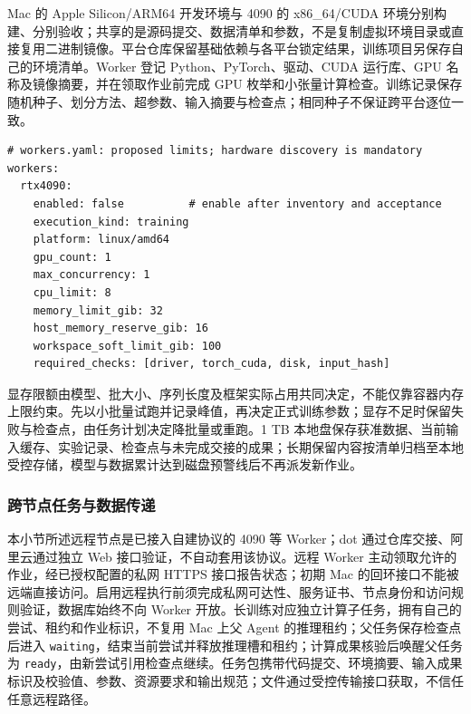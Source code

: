 \documentclass[11pt,a4paper]{article}
\begin{document}
Mac 的 Apple Silicon/ARM64 开发环境与 4090 的 x86\_64/CUDA 环境分别构建、分别验收；共享的是源码提交、数据清单和参数，不是复制虚拟环境目录或直接复用二进制镜像。平台仓库保留基础依赖与各平台锁定结果，训练项目另保存自己的环境清单。Worker 登记 Python、PyTorch、驱动、CUDA 运行库、GPU 名称及镜像摘要，并在领取作业前完成 GPU 枚举和小张量计算检查。训练记录保存随机种子、划分方法、超参数、输入摘要与检查点；相同种子不保证跨平台逐位一致。\cite{pytorch-repro}

\noindent\begin{minipage}{\linewidth}
\begin{lstlisting}
# workers.yaml: proposed limits; hardware discovery is mandatory
workers:
  rtx4090:
    enabled: false          # enable after inventory and acceptance
    execution_kind: training
    platform: linux/amd64
    gpu_count: 1
    max_concurrency: 1
    cpu_limit: 8
    memory_limit_gib: 32
    host_memory_reserve_gib: 16
    workspace_soft_limit_gib: 100
    required_checks: [driver, torch_cuda, disk, input_hash]
\end{lstlisting}
\end{minipage}


显存限额由模型、批大小、序列长度及框架实际占用共同决定，不能仅靠容器内存上限约束。先以小批量试跑并记录峰值，再决定正式训练参数；显存不足时保留失败与检查点，由任务计划决定降批量或重跑。1 TB 本地盘保存获准数据、当前输入缓存、实验记录、检查点与未完成交接的成果；长期保留内容按清单归档至本地受控存储，模型与数据累计达到磁盘预警线后不再派发新作业。

\subsubsection{跨节点任务与数据传递}

本小节所述远程节点是已接入自建协议的 4090 等 Worker；dot 通过仓库交接、阿里云通过独立 Web 接口验证，不自动套用该协议。远程 Worker 主动领取允许的作业，经已授权配置的私网 HTTPS 接口报告状态；初期 Mac 的回环接口不能被远端直接访问。启用远程执行前须完成私网可达性、服务证书、节点身份和访问规则验证，数据库始终不向 Worker 开放。长训练对应独立计算子任务，拥有自己的尝试、租约和作业标识，不复用 Mac 上父 Agent 的推理租约；父任务保存检查点后进入 \texttt{waiting}，结束当前尝试并释放推理槽和租约；计算成果核验后唤醒父任务为 \texttt{ready}，由新尝试引用检查点继续。任务包携带代码提交、环境摘要、输入成果标识及校验值、参数、资源要求和输出规范；文件通过受控传输接口获取，不信任任意远程路径。
\end{document}
